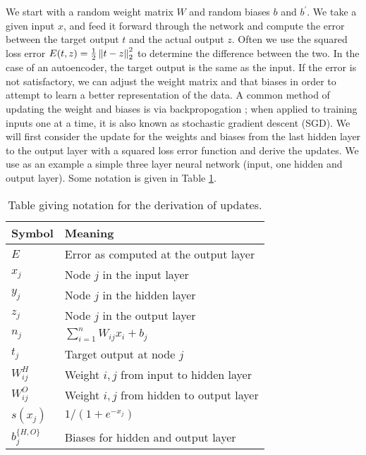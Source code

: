 We start with a random weight matrix $W$ and random biases $b$ and $b^{'}$. We take a given input $x$, and feed it forward through the network and compute the error between the target output $t$ and the actual output $z$. Often we use the squared loss error $E(t,z) = \frac{1}{2}\left\lVert t-z \right\rVert_2^2$ to determine the difference between the two. In the case of an autoencoder, the target output is the same as the input. If the error is not satisfactory, we can adjust the weight matrix and that biases in order to attempt to learn a better representation of the data. A common method of updating the weight and biases is via backpropogation \cite{hecht1989theory}; when applied to training inputs one at a time, it is also known as stochastic gradient descent (SGD). We will first consider the update for the weights and biases from the last hidden layer to the output layer with a squared loss error function and derive the updates. We use as an example a simple three layer neural network (input, one hidden and output layer). Some notation is given in Table \ref{tab:notation}.

\begin{table}[h]
\normalsize
\begin{tabular}{l|l}
Symbol     & Meaning                                                          \\ \hline
$E$          & Error as computed at the output layer                            \\
$x_j$       & Node $j$ in the input layer                                      \\
$y_j$       & Node $j$ in the hidden layer                                     \\
$z_j$       & Node $j$ in the output layer                                     \\
$n_j$       & $\sum_{i=1}^n W_{ij}x_i + b_j$                                   \\
$t_j$       & Target output at node $j$                                   \\
$W_{ij}^H$ & Weight $i,j$ from input to hidden layer \\
$W_{ij}^O$ & Weight $i,j$ from hidden to output layer \\
$s(x_j)$    & $1/(1+e^{-x_j})$                                                 \\
$b_j^{\{H,O\}}$    & Biases for hidden and output layer                                                \\
\end{tabular}
\caption{Table giving notation for the derivation of updates.}
\label{tab:notation}
\end{table}

